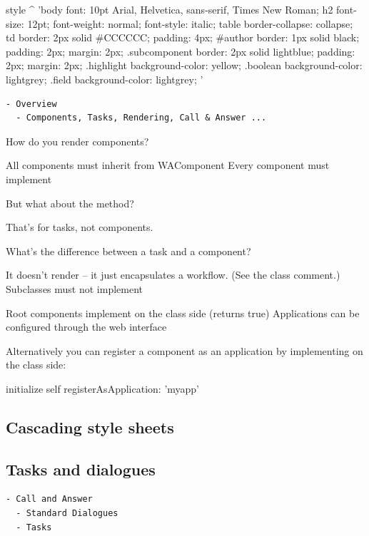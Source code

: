 \documentclass[a4paper,10pt,twoside]{book}
\begin{document}
\begin{code}{}
style
	^ 'body {
	font: 10pt Arial, Helvetica, sans-serif, Times New Roman;
}
h2 {
	font-size: 12pt;
	font-weight: normal;
	font-style: italic;
}
table {
	border-collapse: collapse;
}
td {
	border: 2px solid #CCCCCC;
	padding: 4px;
}
#author {
	border: 1px solid black;
	padding: 2px;
	margin: 2px;
}
.subcomponent {
	border: 2px solid lightblue;
	padding: 2px;
	margin: 2px;
}
.highlight {
	background-color: yellow;
}
.boolean {
	background-color: lightgrey;
}
.field {
	background-color: lightgrey;
}'
\end{code}


\begin{verbatim}
- Overview
  - Components, Tasks, Rendering, Call & Answer ...
\end{verbatim}

\begin{faq}
How do you render components?
\end{faq}
\answer
All components must inherit from WAComponent
Every component must implement 

\begin{faq}
But what about the  method?
\end{faq}
\answer
That's for tasks, not components.

\begin{faq}
What's the difference between a task and a component?
\end{faq}
\answer
It doesn't render -- it just encapsulates a workflow.
(See the class comment.)
Subclasses must not implement 

Root components implement  on the class side (returns true)
Applications can be configured through the web interface

Alternatively you can register a component as an application by implementing  on the class side:
\begin{code}
initialize
	self registerAsApplication: 'myapp'
\end{code}


\subsection{Cascading style sheets}

\subsection{Tasks and dialogues}
\begin{verbatim}
- Call and Answer
  - Standard Dialogues
  - Tasks
\end{verbatim}
\end{document}
